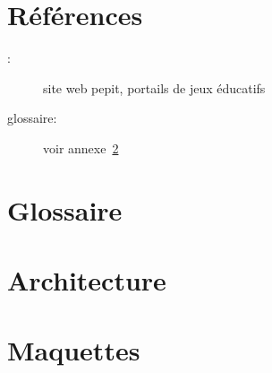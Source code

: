 \chapter{Références}
\begin{description}
	\item[\pepitSite{} :] site web pepit, portails de jeux éducatifs
	\item[glossaire: ] voir annexe~\ref{annexe_glossaire}
\end{description}


\chapter{Glossaire}
\label{annexe_glossaire}



%
%
%


\chapter{Architecture}
\label{annexe_architecture}



\chapter{Maquettes}
